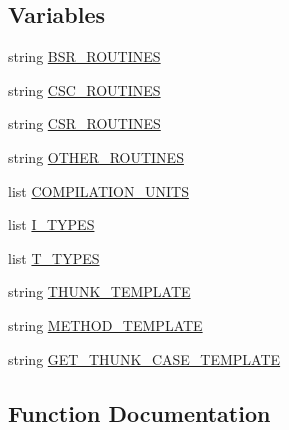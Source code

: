 \subsection*{Variables}
\begin{DoxyCompactItemize}
\item 
string \hyperlink{namespacescipy_1_1sparse_1_1generate__sparsetools_a8d41c0c416f80d2304cf9e469ae6a9a7}{B\+S\+R\+\_\+\+R\+O\+U\+T\+I\+N\+E\+S}
\item 
string \hyperlink{namespacescipy_1_1sparse_1_1generate__sparsetools_a2bee8bb0ce54b9f73ccc8682d6377e6c}{C\+S\+C\+\_\+\+R\+O\+U\+T\+I\+N\+E\+S}
\item 
string \hyperlink{namespacescipy_1_1sparse_1_1generate__sparsetools_a92b8d452abc51ffe88f8cea3ee3744b4}{C\+S\+R\+\_\+\+R\+O\+U\+T\+I\+N\+E\+S}
\item 
string \hyperlink{namespacescipy_1_1sparse_1_1generate__sparsetools_a49a18aee1c135f71f1644be713060270}{O\+T\+H\+E\+R\+\_\+\+R\+O\+U\+T\+I\+N\+E\+S}
\item 
list \hyperlink{namespacescipy_1_1sparse_1_1generate__sparsetools_a6ef9fac0061967a7ca63ba16e6a7aa9e}{C\+O\+M\+P\+I\+L\+A\+T\+I\+O\+N\+\_\+\+U\+N\+I\+T\+S}
\item 
list \hyperlink{namespacescipy_1_1sparse_1_1generate__sparsetools_a3cc0e62bd2f9c00d2d4d1540d92f4f1d}{I\+\_\+\+T\+Y\+P\+E\+S}
\item 
list \hyperlink{namespacescipy_1_1sparse_1_1generate__sparsetools_a04396a3bf7698e500fcd31c3b8598752}{T\+\_\+\+T\+Y\+P\+E\+S}
\item 
string \hyperlink{namespacescipy_1_1sparse_1_1generate__sparsetools_a3e9ff6cfee1ff57715fbcc99081da666}{T\+H\+U\+N\+K\+\_\+\+T\+E\+M\+P\+L\+A\+T\+E}
\item 
string \hyperlink{namespacescipy_1_1sparse_1_1generate__sparsetools_a9cd966a75cdb15636e056cc0b82e51cf}{M\+E\+T\+H\+O\+D\+\_\+\+T\+E\+M\+P\+L\+A\+T\+E}
\item 
string \hyperlink{namespacescipy_1_1sparse_1_1generate__sparsetools_a683454f01c744c00ae18bb6954b6a722}{G\+E\+T\+\_\+\+T\+H\+U\+N\+K\+\_\+\+C\+A\+S\+E\+\_\+\+T\+E\+M\+P\+L\+A\+T\+E}
\end{DoxyCompactItemize}


\subsection{Function Documentation}
\hypertarget{namespacescipy_1_1sparse_1_1generate__sparsetools_a277cdc39ec98ccfaba1506461b60deae}{}
